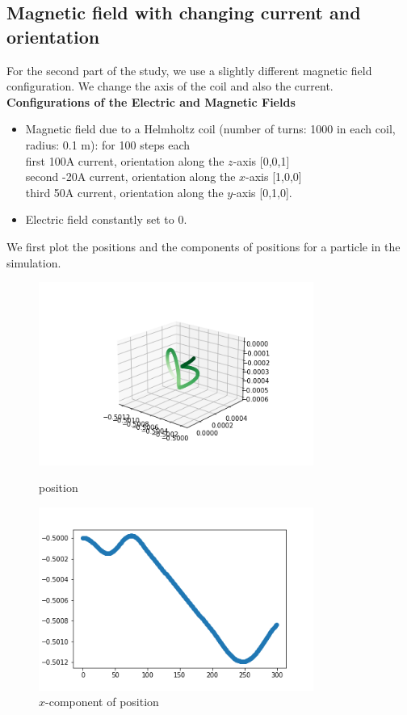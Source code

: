 \documentclass[12pt]{article}
\begin{document}
	\subsection{Magnetic field with changing current and orientation}
	For the second part of the study, we use a slightly different magnetic field configuration. We change the axis of the coil and also the current. \\
	\noindent \textbf{Configurations of the Electric and Magnetic Fields}
	\begin{itemize}
		\item Magnetic field due to a Helmholtz coil (number of turns: 1000 in each coil, radius: 0.1 m): for 100  steps each \\ 
		first 100A current, orientation along
		the $z$-axis [0,0,1] \\
		second -20A current, orientation along the $x$-axis [1,0,0] \\
		third 50A current,
		orientation along the $y$-axis [0,1,0].
		\item Electric field constantly set to 0.
	\end{itemize}
	\noindent We first plot the positions and the components of positions for a particle in the simulation.
	\begin{figure}[H]
		\begin{multicols}{2}
			\includegraphics[width=\linewidth, height=6cm]{ps2.png} \caption{position} \label{ps2} \par
			\includegraphics[width=\linewidth, height=6cm]{psx2.png} \caption{$x$-component of position} \label{psx2} \par
		\end{multicols}
	\end{figure}
\end{document}
